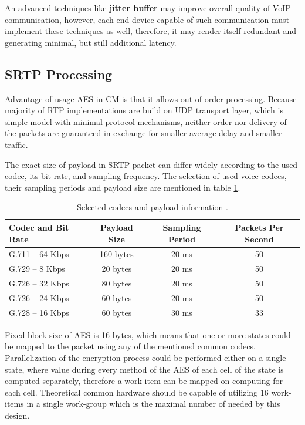 An advanced techniques like \textbf{jitter buffer} may improve overall quality
of VoIP communication, however, each end device capable of such communication must
implement these techniques as well, therefore, it may render itself redundant 
and generating minimal, but still additional latency.

\subsection{SRTP Processing}
Advantage of usage AES in CM is that it allows out-of-order processing. Because
majority of RTP implementations are build on UDP transport layer, which is 
simple model with minimal protocol mechanisms, neither order nor delivery of the
packets are guaranteed in exchange for smaller average delay and smaller 
traffic. 

The exact size of payload in SRTP packet can differ widely according to the 
used codec, its bit rate, and sampling frequency. The selection of used voice
codecs, their sampling periods and payload size are mentioned in table 
\ref{bandwidth}.

\begin{table}[H]
\begin{center}
\begin{tabular}{|l|ccc|}\hline%
  Codec and Bit Rate & Payload Size & Sampling Period & Packets Per Second\\\hline
  G.711 -- 64 Kbps   & 160 bytes    & 20 ms           & 50 \\
  G.729 -- 8 Kbps    & 20 bytes     & 20 ms           & 50 \\
  G.726 -- 32 Kbps   & 80 bytes     & 20 ms           & 50 \\
  G.726 -- 24 Kbps   & 60 bytes     & 20 ms           & 50 \\
  G.728 -- 16 Kbps   & 60 bytes     & 30 ms           & 33 \\
 \hline
\end{tabular}
\end{center}
\caption{Selected codecs and payload information \cite{rtpbandwidth}.}
\label{bandwidth}
\end{table}

Fixed block size of AES is 16 bytes, which means that one or more states could
be mapped to the packet using any of the mentioned common codecs. Parallelization
of the encryption process could be performed either on a single state, where
value during every method of the AES of each cell of the state is computed 
separately, therefore a work-item can be mapped on computing for each cell. 
Theoretical common hardware should be capable of utilizing 16 work-items in a 
single work-group which is the maximal number of needed by this design.

